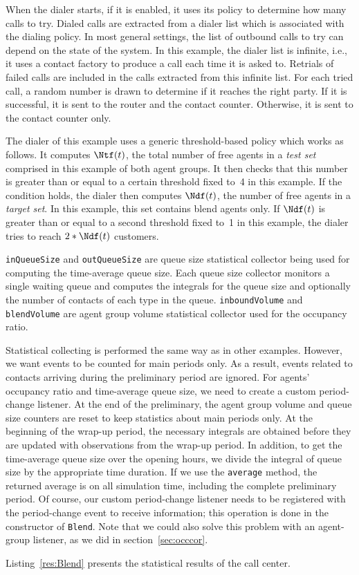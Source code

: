 When the dialer starts, if it is enabled, it uses its policy to
determine how many calls to try.  Dialed calls are extracted from a
dialer list which is associated with the dialing policy.  In most
general settings, the list of outbound calls to try can depend on the
state of the system.  In this example, the dialer list is infinite,
i.e., it uses a contact factory to produce a call each time it is
asked to.  Retrials of failed calls are included in the calls extracted
from this infinite list.
For each tried call, a random number is drawn to
determine if it reaches the right party.  If it is successful, it is
sent to the router and the contact counter.  Otherwise, it is sent to
the contact counter only.

The dialer of this example uses a generic threshold-based policy which
works as follows.
It computes $\Ntf(t)$,
the total number of free agents in a \emph{test set} comprised in this
example of both agent groups.
It then checks that this
number is greater than or equal to a certain threshold fixed to~4 in
this example.
If the condition holds, the dialer then computes $\Ndf(t)$, the number
of free agents in a \emph{target set}.  In this example, this set
contains blend agents only.
If $\Ndf(t)$ is greater than or equal to a second threshold fixed to~1
in this example, the
dialer tries to reach $2*\Ndf(t)$ customers.

\texttt{in\-Queue\-Size} and \texttt{out\-Queue\-Size} are queue size
statistical collector being used for computing the time-average queue
size.  Each queue size collector monitors a single waiting queue and
computes the integrals for the queue size and optionally the number
of contacts of each type in the queue.  \texttt{inbound\-Volume} and
\texttt{blend\-Volume} are agent group volume statistical collector
used for the occupancy ratio.

Statistical collecting is performed the same way as in other
examples.  However, we want events to be counted for main periods
only.  As a result, events related to contacts arriving during the
preliminary period are ignored.  For agents' occupancy ratio and
time-average queue size, we need to create a custom period-change
listener.  At the end of the preliminary, the agent group volume and
queue size counters are reset to keep statistics about main periods
only.  At the beginning of the wrap-up period, the necessary integrals
are obtained before they are updated with observations from the
wrap-up period.
In addition, to get the time-average queue size over the opening
hours,
we divide the integral of queue size by the appropriate time
duration.  If we use the \texttt{average} method, the returned average
is on all simulation time, including the complete preliminary period.
Of course, our custom period-change listener needs to be registered
with the period-change event to receive information; this operation is
done in the constructor of \texttt{Blend}.
Note that we could also solve this problem with an agent-group
listener, as we did in section~\ref{sec:occcor}.

Listing~\ref{res:Blend} presents the statistical
results of the call center.


